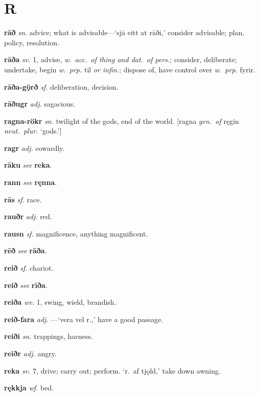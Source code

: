 \documentclass[12pt,letterpaper]{book}
\newcommand\emptypage{\clearpage{\pagestyle{empty}\cleardoublepage}}
\begin{document}
\emptypage

\chapter*{R}

\noindent
\textbf{rāð} \textit{sn.} advice; what is advisable---`sjā eitt at rāði,'
    consider advisable; plan, policy, resolution.

\noindent
\textbf{rāða} \textit{sv.} 1, advise, \textit{w.\ acc.\ of thing and dat.\ of pers.};
    consider, deliberate; undertake, begin \textit{w.\ prp.} til \textit{or
    infin.}; dispose of, have control over \textit{w.\ prp.} fyrir.

\noindent
\textbf{rāða-gǫ̈rð} \textit{sf.} deliberation, decision.

\noindent
\textbf{rāðugr} \textit{adj.} sagacious.

\noindent
\textbf{ragna-rökr} \textit{sn.} twilight of the gods, end of the world.  [ragna
    \textit{gen.\ of} ręgin \textit{neut.\ plur.} `gods.']

\noindent
\textbf{ragr} \textit{adj.} cowardly.

\noindent
\textbf{rāku} \textit{} \textit{see} \textbf{reka}.

\noindent
\textbf{rann} \textit{} \textit{see} \textbf{ręnna}.

\noindent
\textbf{rās} \textit{sf.} race.

\noindent
\textbf{rauðr} \textit{adj.} red.

\noindent
\textbf{rausn} \textit{sf.} magnificence, anything magnificent.

\noindent
\textbf{rēð} \textit{} \textit{see} \textbf{rāða}.

\noindent
\textbf{reið} \textit{sf.} chariot.

\noindent
\textbf{reið} \textit{} \textit{see} \textbf{rīða}.

\noindent
\textbf{reiða} \textit{wv.} 1, swing, wield, brandish.

\noindent
\textbf{reið-fara} \textit{adj.} ---`vera vel r.,' have a good passage.

\noindent
\textbf{reiði} \textit{sn.} trappings, harness.

\noindent
\textbf{reiðr} \textit{adj.} angry.

\noindent
\textbf{reka} \textit{sv.} 7, drive; carry out; perform.  `r.\ af tjǫld,' take
    down awning.

\noindent
\textbf{rękkja} \textit{wf.} bed.
\end{document}
